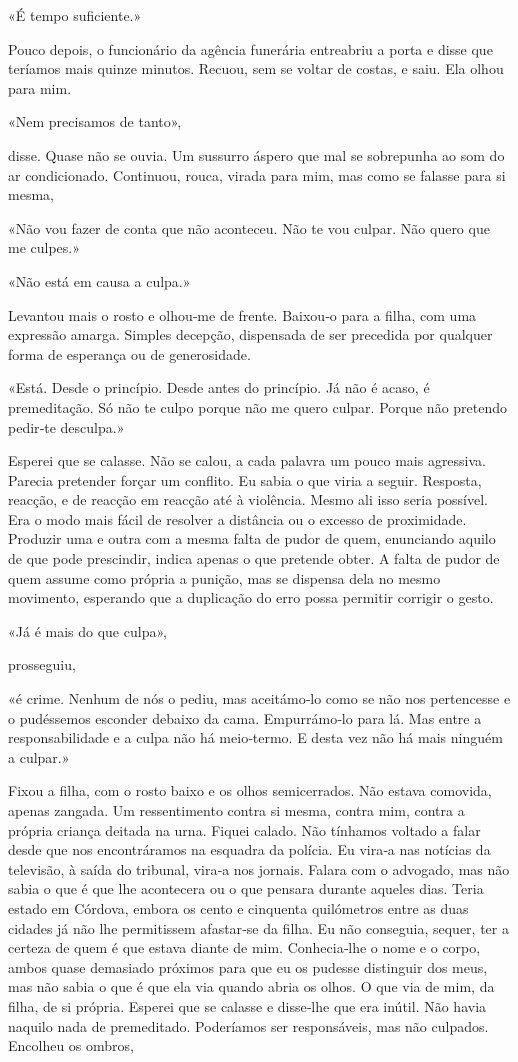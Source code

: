 «É tempo suficiente.»

Pouco depois, o funcionário da agência funerária entreabriu a porta e
disse que teríamos mais quinze minutos. Recuou, sem se voltar de costas,
e saiu. Ela olhou para mim.

«Nem precisamos de tanto»,

disse. Quase não se ouvia. Um sussurro áspero que mal se sobrepunha ao
som do ar condicionado. Continuou, rouca, virada para mim, mas como se
falasse para si mesma,

«Não vou fazer de conta que não aconteceu. Não te vou culpar. Não quero
que me culpes.»

«Não está em causa a culpa.»

Levantou mais o rosto e olhou­‑me de frente. Baixou­‑o para a filha, com
uma expressão amarga. Simples decepção, dispensada de ser precedida por
qualquer forma de esperança ou de generosidade.

«Está. Desde o princípio. Desde antes do princípio. Já não é acaso, é
premeditação. Só não te culpo porque não me quero culpar. Porque não
pretendo pedir­‑te desculpa.»

Esperei que se calasse. Não se calou, a cada palavra um pouco mais
agressiva. Parecia pretender forçar um conflito. Eu sabia o que viria a
seguir. Resposta, reacção, e de reacção em reacção até à violência.
Mesmo ali isso seria possível. Era o modo mais fácil de resolver a
distância ou o excesso de proximidade. Produzir uma e outra com a mesma
falta de pudor de quem, enunciando aquilo de que pode prescindir, indica
apenas o que pretende obter. A falta de pudor de quem assume como
própria a punição, mas se dispensa dela no mesmo movimento, esperando
que a duplicação do erro possa permitir corrigir o gesto.

«Já é mais do que culpa»,

prosseguiu,

«é crime. Nenhum de nós o pediu, mas aceitámo­‑lo como se não nos
pertencesse e o pudéssemos esconder debaixo da cama. Empur­rámo­‑lo para
lá. Mas entre a responsabilidade e a culpa não há meio­‑termo. E desta
vez não há mais ninguém a culpar.»

Fixou a filha, com o rosto baixo e os olhos semicerrados. Não estava
comovida, apenas zangada. Um ressentimento contra si mesma, contra mim,
contra a própria criança deitada na urna. Fiquei calado. Não tínhamos
voltado a falar desde que nos encontráramos na esquadra da polícia. Eu
vira­‑a nas notícias da televisão, à saída do tribunal, vira­‑a nos
jornais. Falara com o advogado, mas não sabia o que é que lhe acontecera
ou o que pensara durante aqueles dias. Teria estado em Córdova, embora
os cento e cinquenta quilómetros entre as duas cidades já não lhe
permitissem afastar­‑se da filha. Eu não conseguia, sequer, ter a
certeza de quem é que estava diante de mim. Conhecia­‑lhe o nome e o
corpo, ambos quase demasiado próximos para que eu os pudesse distinguir
dos meus, mas não sabia o que é que ela via quando abria os olhos. O que
via de mim, da filha, de si própria. Esperei que se calasse e disse­‑lhe
que era inútil. Não havia naquilo nada de premeditado. Poderíamos ser
responsáveis, mas não culpados. Encolheu os ombros,

